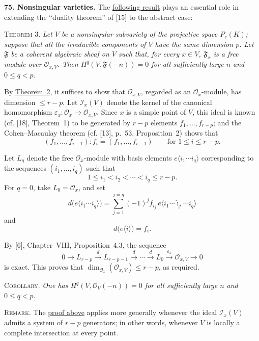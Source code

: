 
\medskip
{}\label{fac:III:5:no:75}
\textbf{75. Nonsingular varieties.} The
\hyperref[fac:III:5:no:75:thm:3]{following result} plays an
essential role in extending the ``duality theorem'' of [15] to the
abstract case:

\label{fac:III:5:no:75:thm:3}
\textsc{Theorem 3.} \textit{Let $V$ be a nonsingular subvariety of the
projective space $P_r(K)$; suppose that all the irreducible components
of $V$ have the same dimension $p$. Let $\mathfrak F$ be a coherent
algebraic sheaf on $V$ such that, for every $x\in V$, $\mathfrak F_x$
is a free module over $\mathcal O_{x,V}$. Then
$H^q(V,\mathfrak F(-n))=0$ for all sufficiently large $n$ and
$0\leq q<p$.}

\label{fac:III:5:no:75:thm:3:proof}
By \hyperref[fac:III:5:no:74:thm:2]{Theorem~2}, it suffices to show that
$\mathcal O_{x,V}$, regarded as an $\mathcal O_x$-module, has dimension
$\leq r-p$. Let $\mathcal I_x(V)$ denote the kernel of the canonical
homomorphism
$\varepsilon_x:\mathcal O_x\longrightarrow\mathcal O_{x,V}$.
Since $x$ is a simple point of $V$, this ideal is known (cf. [18],
Theorem~1) to be generated by $r-p$ elements
$f_1,\ldots,f_{r-p}$; and the Cohen--Macaulay theorem
(cf. [13], p.~53, Proposition~2) shows that
\label{fac:III:5:no:75:formula:colon}
\[
(f_1,\ldots,f_{i-1}):f_i=(f_1,\ldots,f_{i-1})
\qquad\text{for }1\leq i\leq r-p.
\]

Let $L_q$ denote the free $\mathcal O_x$-module with basis elements
$e\langle i_1\cdots i_q\rangle$ corresponding to the sequences
$(i_1,\ldots,i_q)$ such that
\label{fac:III:5:no:75:def:Lq}
\[
1\leq i_1<i_2<\cdots<i_q\leq r-p.
\]
For $q=0$, take $L_0=\mathcal O_x$, and set
\label{fac:III:5:no:75:formula:differential}
\[
d\bigl(e\langle i_1\cdots i_q\rangle\bigr)
=\sum_{j=1}^{j=q}(-1)^j f_{i_j}\,
e\langle i_1\cdots\widehat{\imath}_j\cdots i_q\rangle
\]
and
\[
d\bigl(e\langle i\rangle\bigr)=f_i.
\]

By [6], Chapter~VIII, Proposition~4.3, the sequence
\label{fac:III:5:no:75:formula:resolution}
\[
0\longrightarrow L_{r-p}\overset d\longrightarrow L_{r-p-1}
\overset d\longrightarrow\cdots\overset d\longrightarrow L_0
\overset{\varepsilon_x}\longrightarrow\mathcal O_{x,V}
\longrightarrow0
\]
is exact. This proves that
$\dim_{\mathcal O_x}(\mathcal O_{x,V})\leq r-p$, as required.

\label{fac:III:5:no:75:cor}
\textsc{Corollary.} \textit{One has
$H^q(V,\mathcal O_V(-n))=0$ for all sufficiently large $n$ and
$0\leq q<p$.}

\label{fac:III:5:no:75:remark}
\textsc{Remark.} The
\hyperref[fac:III:5:no:75:thm:3:proof]{proof above} applies more generally whenever the
ideal $\mathcal I_x(V)$ admits a system of $r-p$ generators; in other
words, whenever $V$ is locally a complete intersection at every point.
